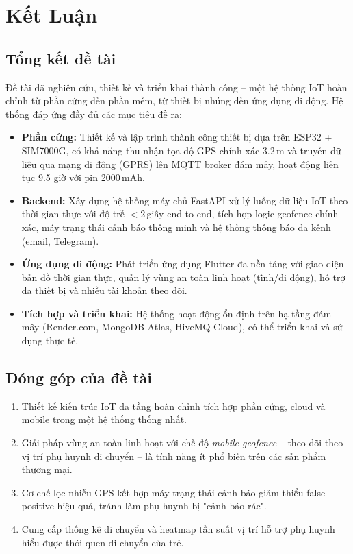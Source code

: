 \chapter{Kết Luận}

\section{Tổng kết đề tài}

Đề tài đã nghiên cứu, thiết kế và triển khai thành công \textbf{\systemname{}} -- một hệ thống IoT hoàn chỉnh từ phần cứng đến phần mềm, từ thiết bị nhúng đến ứng dụng di động. Hệ thống đáp ứng đầy đủ các mục tiêu đề ra:

\begin{itemize}
  \item \textbf{Phần cứng:} Thiết kế và lập trình thành công thiết bị dựa trên ESP32 + SIM7000G, có khả năng thu nhận tọa độ GPS chính xác 3.2\,m và truyền dữ liệu qua mạng di động (GPRS) lên MQTT broker đám mây, hoạt động liên tục 9.5 giờ với pin 2000\,mAh.

  \item \textbf{Backend:} Xây dựng hệ thống máy chủ FastAPI xử lý luồng dữ liệu IoT theo thời gian thực với độ trễ $<$2\,giây end-to-end, tích hợp logic geofence chính xác, máy trạng thái cảnh báo thông minh và hệ thống thông báo đa kênh (email, Telegram).

  \item \textbf{Ứng dụng di động:} Phát triển ứng dụng Flutter đa nền tảng với giao diện bản đồ thời gian thực, quản lý vùng an toàn linh hoạt (tĩnh/di động), hỗ trợ đa thiết bị và nhiều tài khoản theo dõi.

  \item \textbf{Tích hợp và triển khai:} Hệ thống hoạt động ổn định trên hạ tầng đám mây (Render.com, MongoDB Atlas, HiveMQ Cloud), có thể triển khai và sử dụng thực tế.
\end{itemize}

\section{Đóng góp của đề tài}

\begin{enumerate}
  \item Thiết kế kiến trúc IoT đa tầng hoàn chỉnh tích hợp phần cứng, cloud và mobile trong một hệ thống thống nhất.

  \item Giải pháp vùng an toàn linh hoạt với chế độ \textit{mobile geofence} -- theo dõi theo vị trí phụ huynh di chuyển -- là tính năng ít phổ biến trên các sản phẩm thương mại.

  \item Cơ chế lọc nhiễu GPS kết hợp máy trạng thái cảnh báo giảm thiểu false positive hiệu quả, tránh làm phụ huynh bị "cảnh báo rác".

  \item Cung cấp thống kê di chuyển và heatmap tần suất vị trí hỗ trợ phụ huynh hiểu được thói quen di chuyển của trẻ.
\end{enumerate}

